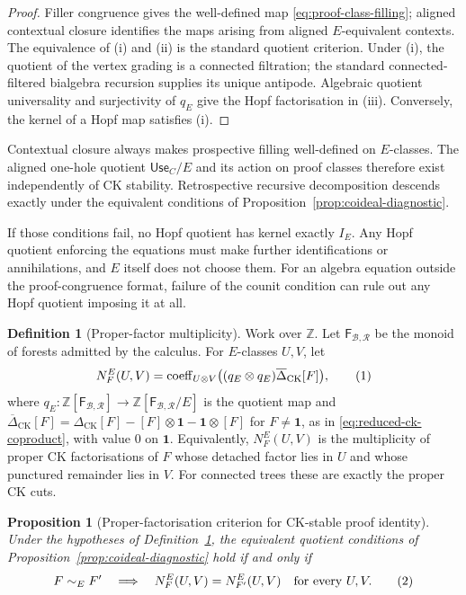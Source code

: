 \documentclass[10pt,a4paper]{article}
\theoremstyle{plain}
\newtheorem{proposition}[theorem]{Proposition}
\theoremstyle{definition}
\newtheorem{definition}[theorem]{Definition}
\theoremstyle{remark}
\newcommand{\Base}{\mathcal B}
\newcommand{\Rules}{\mathcal R}
\newcommand{\Forests}{\mathsf F}
\newcommand{\DeltaCK}{\Delta_{\mathrm{CK}}}
\newcommand{\one}{\mathbf 1}
\newcommand{\eqtag}{\refstepcounter{equation}\tag{\theequation}}
\begin{document}
\begin{proof}
Filler congruence gives the well-defined map
\eqref{eq:proof-class-filling}; aligned contextual closure identifies the
maps arising from aligned \(E\)-equivalent contexts.  The equivalence of
(i) and (ii) is the standard
quotient criterion.  Under (i), the quotient of the vertex grading is a
connected filtration; the standard connected-filtered bialgebra recursion
supplies its unique antipode.  Algebraic quotient universality and
surjectivity of \(q_E\) give the Hopf factorisation in (iii).  Conversely,
the kernel of a Hopf map satisfies (i).
\end{proof}

Contextual closure always makes prospective filling well-defined on
\(E\)-classes.  The aligned one-hole quotient \(\mathsf{Use}_C/E\) and its
action on proof classes therefore exist independently of CK stability.
Retrospective recursive decomposition descends exactly under the equivalent
conditions of Proposition~\ref{prop:coideal-diagnostic}.

If those conditions fail, no Hopf quotient has kernel exactly \(I_E\).
Any Hopf quotient enforcing the equations must make further identifications
or annihilations, and \(E\) itself does not choose them.  For an algebra
equation outside the proof-congruence format, failure of the counit
condition can rule out any Hopf quotient imposing it at all.

\begin{definition}[Proper-factor multiplicity]
\label{def:proper-factor-multiplicity}
Work over \(\mathbb Z\).  Let
\(\Forests_{\Base,\Rules}\) be the
monoid of forests admitted by the calculus.  For \(E\)-classes \(U,V\), let
\[
 N_F^E(U,V)
 =
 \operatorname{coeff}_{U\otimes V}
 \bigl((q_E\otimes q_E)\overline\Delta_{\mathrm{CK}}[F]\bigr),
\eqtag\label{eq:proper-factorisation-count}
\]
where
\(
q_E:\mathbb Z[\Forests_{\Base,\Rules}]\to
       \mathbb Z[\Forests_{\Base,\Rules}/E]
\)
is the quotient map and
\(\overline\Delta_{\mathrm{CK}}[F]
=\DeltaCK[F]-[F]\otimes\one-\one\otimes[F]\) for \(F\ne\one\), as in
\eqref{eq:reduced-ck-coproduct}, with value \(0\) on \(\one\).
Equivalently, \(N_F^E(U,V)\) is the multiplicity of proper CK
factorisations of \(F\) whose detached factor lies in \(U\) and whose
punctured remainder lies in \(V\).  For connected trees these are exactly
the proper CK cuts.
\end{definition}

\begin{proposition}[Proper-factorisation criterion for CK-stable proof identity]
\label{prop:proper-factorisation-criterion}
Under the hypotheses of Definition~\ref{def:proper-factor-multiplicity},
the equivalent quotient conditions of
Proposition~\ref{prop:coideal-diagnostic} hold if and only if
\[
 F\sim_EF'
 \quad\Longrightarrow\quad
 N_F^E(U,V)=N_{F'}^E(U,V)
\quad\text{for every }U,V.
\eqtag\label{eq:proper-factorisation-bisimulation}
\]
\end{proposition}
\end{document}
